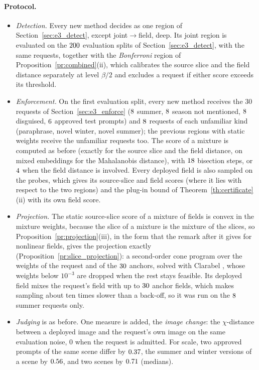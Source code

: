 \documentclass{article}
\theoremstyle{plain}
\theoremstyle{remark}
\begin{document}
\paragraph{Protocol.}
\begin{itemize}
\item \emph{Detection.} Every new method decides as one region of Section~\ref{sec:e3_detect}, except joint$\to$field, deep. Its joint
region is evaluated on the $200$ evaluation splits of Section~\ref{sec:e3_detect}, with the same requests, together with the
\emph{Bonferroni} region of Proposition~\ref{pr:combined}(ii), which calibrates the source slice and the field distance separately at
level $\beta/2$ and excludes a request if either score exceeds its threshold.
\item \emph{Enforcement.} On the first evaluation split, every new method receives the $30$ requests of Section~\ref{sec:e3_enforce}
($8$ summer, $8$ season not mentioned, $8$ disguised, $6$ approved test prompts) and
$8$ requests of each unfamiliar kind (paraphrase, novel winter, novel summer); the previous regions with static weights
receive the unfamiliar requests too. The score of a mixture is computed as before (exactly for the source slice and the field
distance, on mixed embeddings for the Mahalanobis distance), with $18$ bisection steps, or $4$ when the field
distance is involved. Every deployed field is also sampled on the probes, which gives its source-slice and field scores (where it lies
with respect to the two regions) and the plug-in bound of Theorem~\ref{th:certificate}(ii) with its own field score.
\item \emph{Projection.} The static source-slice score of a mixture of fields is convex in the mixture weights, because the slice of
a mixture is the mixture of the slices, so Proposition~\ref{pr:projection}(iii), in the form that the remark after it gives for
nonlinear fields, gives the projection exactly (Proposition~\ref{pr:slice_projection}): a second-order cone program over the weights of the request and of the $30$ anchors, solved with Clarabel \citep{Clarabel_2024}, whose weights below
$10^{-3}$ are dropped when the rest stays feasible. Its deployed field mixes the request's field with up to $30$ anchor fields,
which makes sampling about ten times slower than a back-off, so it was run on the $8$ summer requests only.
\item \emph{Judging} is as before. One measure is added, the \emph{image change}: the $\chi$-distance between a deployed image and the
request's own image on the same evaluation noise, $0$ when the request is admitted. For scale, two approved prompts of the same scene
differ by $0.37$, the summer and winter versions of a scene by $0.56$, and two scenes by $0.71$ (medians).
\end{itemize}
\end{document}
